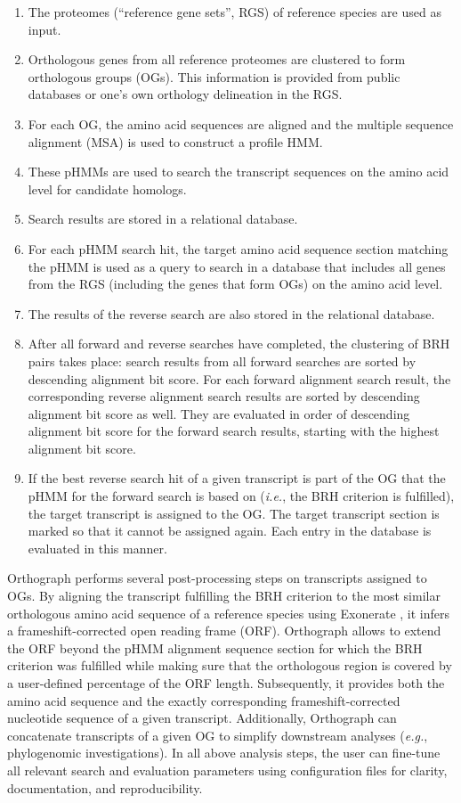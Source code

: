 \begin{enumerate}
\item
  The proteomes (``reference gene sets'', RGS) of reference species are
  used as input.
\item
  Orthologous genes from all reference proteomes are clustered to form
  orthologous groups (OGs). This information is provided from public
  databases or one's own orthology delineation in the RGS.
\item
  For each OG, the amino acid sequences are aligned and the multiple
  sequence alignment (MSA) is used to construct a profile HMM.
\item
  These pHMMs are used to search the transcript sequences on the amino
  acid level for candidate homologs.
\item
  Search results are stored in a relational database.
\item
  For each pHMM search hit, the target amino acid sequence section
  matching the pHMM is used as a query to search in a database that
  includes all genes from the RGS (including the genes that form OGs) on
  the amino acid level.
\item
  The results of the reverse search are also stored in the relational
  database.
\item
  After all forward and reverse searches have completed, the clustering
  of BRH pairs takes place: search results from all forward searches are
  sorted by descending alignment bit score. For each forward alignment
  search result, the corresponding reverse alignment search results are
  sorted by descending alignment bit score as well. They are evaluated
  in order of descending alignment bit score for the forward search
  results, starting with the highest alignment bit score.
\item
  If the best reverse search hit of a given transcript is part of the OG
  that the pHMM for the forward search is based on (\emph{i.e.}, the BRH
  criterion is fulfilled), the target transcript is assigned to the OG.
  The target transcript section is marked so that it cannot be assigned
  again. Each entry in the database is evaluated in this manner.
\end{enumerate}

Orthograph performs several post-processing steps on transcripts
assigned to OGs. By aligning the transcript fulfilling the BRH criterion
to the most similar orthologous amino acid sequence of a reference
species using Exonerate \cite{Slater2005}, it infers a
frameshift-corrected open reading frame (ORF). Orthograph allows to
extend the ORF beyond the pHMM alignment sequence section for which the
BRH criterion was fulfilled while making sure that the orthologous
region is covered by a user-defined percentage of the ORF length.
Subsequently, it provides both the amino acid sequence and the exactly
corresponding frameshift-corrected nucleotide sequence of a given
transcript. Additionally, Orthograph can concatenate transcripts of a
given OG to simplify downstream analyses (\emph{e.g.}, phylogenomic
investigations). In all above analysis steps, the user can fine-tune all
relevant search and evaluation parameters using configuration files for
clarity, documentation, and reproducibility.

